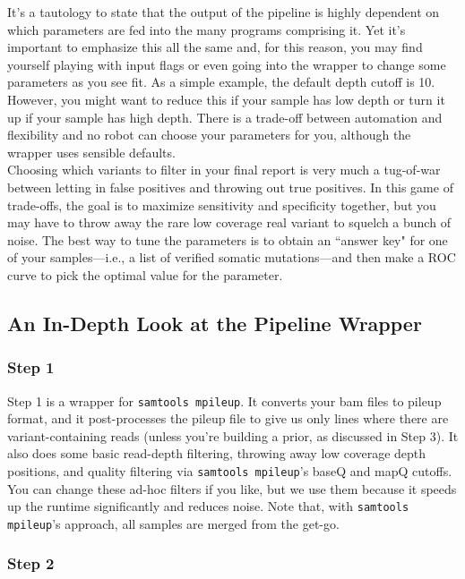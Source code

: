 \documentclass[letterpaper,14pt]{memoir}
\begin{document}
It's a tautology to state that the output of the pipeline is highly dependent on which parameters are fed into the many programs comprising it.
Yet it's important to emphasize this all the same and, for this reason, you may find yourself playing with input flags or even going into the wrapper to change some parameters as you see fit.
As a simple example, the default depth cutoff is 10.
However, you might want to reduce this if your sample has low depth or turn it up if your sample has high depth.
There is a trade-off between automation and flexibility and no robot can choose your parameters for you, although the wrapper uses sensible defaults.\\

Choosing which variants to filter in your final report is very much a tug-of-war between letting in false positives and throwing out true positives. In this game of trade-offs, the goal is to maximize sensitivity and specificity together, but you may have to throw away the rare low coverage real variant to squelch a bunch of noise. The best way to tune the parameters is to obtain an ``answer key" for one of your samples---i.e., a list of verified somatic mutations---and then make a ROC curve to pick the optimal value for the parameter. 

\subsection{An In-Depth Look at the Pipeline Wrapper}\label{In Depth}

\subsubsection{Step 1}

Step 1 is a wrapper for \texttt{samtools mpileup}. 
It converts your bam files to pileup format, and it post-processes the pileup file to give us only lines where there are variant-containing reads (unless you're building a prior, as discussed in Step 3).
It also does some basic read-depth filtering, throwing away low coverage depth positions, and quality filtering via \texttt{samtools mpileup}'s baseQ and mapQ cutoffs.
You can change these ad-hoc filters if you like, but we use them because it speeds up the runtime significantly and reduces noise.
Note that, with \texttt{samtools mpileup}'s approach, all samples are merged from the get-go.

\subsubsection{Step 2}
\end{document}
